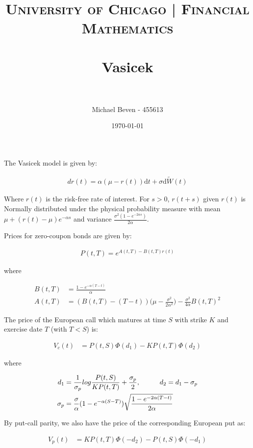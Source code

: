 \documentclass[paper=a4, fontsize=11pt]{scrartcl} %
\title{	
\normalfont \normalsize 
\textsc{University of Chicago | Financial Mathematics} \\ [25pt] %
\horrule{0.5pt} \\[0.4cm] %
\huge Vasicek \\ %
\horrule{2pt} \\[0.5cm] %
}
\author{Michael Beven - 455613} %
\date{\normalsize\today} %
\numberwithin{equation}{section} %
\numberwithin{figure}{section} %
\numberwithin{table}{section} %
\begin{document}
\maketitle %


\break

The Vasicek model is given by:

\begin {align*}
dr(t) = \alpha(\mu - r(t))\mathrm{d}t + \sigma \mathrm{d} \tilde W(t)
\end{align*}

Where $r(t)$ is the risk-free rate of interest.  For $s > 0$, $r(t+s)$ given $r(t)$ is Normally distributed under the physical probability measure with mean $\mu + (r(t) - \mu)e^{- \alpha s}$ and variance $\frac{\sigma^2 (1 - e^{-2\alpha s})}{2\alpha}$.

Prices for zero-coupon bonds are given by:

\begin{align*}
P(t,T) = e^{A(t,T) - B(t,T)r(t)}
\end{align*}

where

\begin{align*}
B(t,T) &= \frac{1-e^{-\alpha (T - t)}}{\alpha}\\
A(t,T) &= (B(t,T) - (T - t))\Bigg( \mu - \frac{\sigma^2}{2\alpha^2}\Bigg) - \frac{\sigma^2}{4\alpha}B(t,T)^2
\end{align*}

The price of the European call which matures at time $S$ with strike $K$ and exercise date $T$ (with $T < S$) is:

\begin{align*}
V_c(t) &= P(t,S)\Phi (d_1) - K P(t,T) \Phi(d_2)
\end{align*}

where

\begin{align*}
d_1 &= \frac{1}{\sigma_p} log \frac{P(t,S)}{KP(t,T)} + \frac{\sigma_p}{2}, \hspace{10mm} d_2 = d_1 - \sigma_p\\
\sigma_p &= \frac{\sigma}{\alpha} (1 - e^{-\alpha (S - T)}) \sqrt{\frac{1 - e^{-2\alpha(T-t)}}{2\alpha}}
\end{align*}

By put-call parity, we also have the price of the corresponding European put as:

\begin{align*}
V_p(t) &= K P(t,T) \Phi(-d_2) - P(t,S)\Phi (-d_1)
\end{align*}

\end{document}
